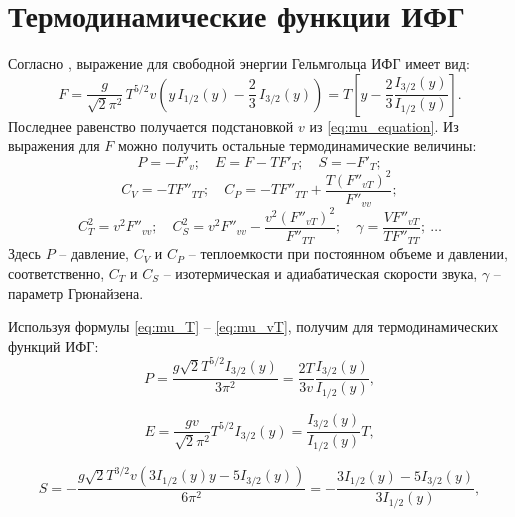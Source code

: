 \section{Термодинамические функции ИФГ}
Согласно \cite{kirzhnits:UFN:1975}, выражение для свободной энергии Гельмгольца ИФГ имеет вид:
\begin{equation}
   \label{eq:helmholtz_potential}
   F = \frac{g}{\sqrt{2}\pi^2}\,  T^{5 / 2} v \left( y \, I_{1 /2} (y) - \frac{2}{3}\, I_{3 / 2} (y) \right)
   = T\left[y - \frac{2}{3}\frac{I_{3/2}(y)}{I_{1/2}(y)}\right].
\end{equation}
Последнее равенство получается подстановкой $v$ из \eqref{eq:mu_equation}.
Из выражения для $F$ можно получить остальные термодинамические величины:
\begin{equation}
    \label{eq:PES}
    P = -F'_v;\quad
    E = F - TF'_T;\quad
    S = -F'_T;
\end{equation}
\begin{equation}
    \label{eq:CVCP}
    C_V = -TF''_{TT};\quad
    C_P = -TF''_{TT} + \frac{T(F''_{vT})^2}{F''_{vv}};
\end{equation}
\begin{equation}
    \label{eq:CTCS}
    C_T^2 = v^2F''_{vv};\quad
    C_S^2 = v^2F''_{vv} - \frac{v^2(F''_{vT})^2}{F''_{TT}};\quad
    \gamma = \frac{VF''_{vT}}{TF''_{TT}};\ \ldots
\end{equation}
Здесь $P$ -- давление, $C_V$ и $C_P$ -- теплоемкости при постоянном объеме и давлении, соответственно, $C_T$ и $C_S$ -- изотермическая и адиабатическая скорости звука, $\gamma$ -- параметр Грюнайзена.

Используя формулы \eqref{eq:mu_T} -- \eqref{eq:mu_vT}, получим для термодинамических функций ИФГ:
\begin{equation}
   \label{eq:pressure}
   P = \frac{g \sqrt{2} T^{5 /2} I_{3 / 2}(y)}{3 \pi^{2}}
   = \frac{2T}{3v}\frac{I_{3/2}(y)}{I_{1/2}(y)},
\end{equation}

\begin{equation}
   \label{eq:energy}
   E = \frac{g v}{\sqrt{2}\pi^2} T^{5 /2} I_{3 / 2}(y)
   = \frac{I_{3/2}(y)}{I_{1/2}(y)}T,
\end{equation}

\begin{equation}
   \label{eq:entropy}
   S = -\frac{g\sqrt{2} T^{3 /2} v\left(3 I_{1 / 2}(y) y-5 I_{3 / 2}(y)\right)}{6 \pi^{2}}
   = -\frac{3I_{1/2}(y) - 5I_{3/2}(y)}{3I_{1/2}(y)},
\end{equation}

